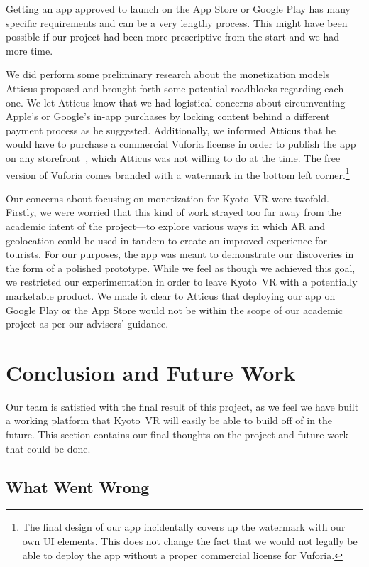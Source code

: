 \documentclass[a4paper, 10pt, american, titlepage]{article}
\begin{document}
Getting an app approved to launch on the App Store or Google Play has many
specific requirements and can be a very lengthy process. This might have been
possible if our project had been more prescriptive from the start and we had
more time.

We did perform some preliminary research about the monetization models Atticus
proposed and brought forth some potential roadblocks regarding each one. We let
Atticus know that we had logistical concerns about circumventing Apple's or
Google's in-app purchases by locking content behind a different payment process
as he suggested. Additionally, we informed Atticus that he would have to
purchase a commercial Vuforia license in order to publish the app on any
storefront~\autocite{vuforialicense2018}, which Atticus was not willing to do at
the time. The free version of Vuforia comes branded with a watermark in the
bottom left corner.\footnote{The final design of our app incidentally covers up
the watermark with our own UI elements. This does not change the fact that we
would not legally be able to deploy the app without a proper commercial license
for Vuforia.}

Our concerns about focusing on monetization for Kyoto~VR were twofold. Firstly,
we were worried that this kind of work strayed too far away from the academic
intent of the project---to explore various ways in which AR and geolocation
could be used in tandem to create an improved experience for tourists. For our
purposes, the app was meant to demonstrate our discoveries in the form of a
polished prototype. While we feel as though we achieved this goal, we restricted
our experimentation in order to leave Kyoto~VR with a potentially marketable
product. We made it clear to Atticus that deploying our app on Google Play
or the App Store would not be within the scope of our academic project as per
our advisers' guidance.

\clearpage

\section{Conclusion and Future Work}
\label{sec:conclusionAndFutureWork}

Our team is satisfied with the final result of this project, as we feel we have
built a working platform that Kyoto~VR will easily be able to build off of in
the future. This section contains our final thoughts on the project and future
work that could be done.

\subsection{What Went Wrong}
\label{sec:whatWentWrong}
\end{document}
